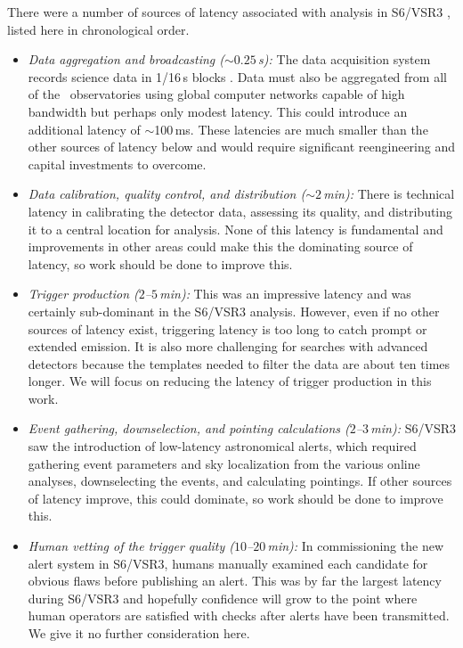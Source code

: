 There were a number of sources of latency associated with \CBC{}
analysis in S6/VSR3 \citep{HugheyGWPAW2011}, listed here in chronological order.
%
\begin{itemize}
%
\item {\it Data aggregation and broadcasting ($\sim$$0.25$\,s):}
The \LIGO{} data acquisition system records science
data in 1/16\,s blocks \citep{Bork2001}. Data must also be aggregated from all
of the \GW\ observatories using global computer networks capable of high
bandwidth but perhaps only modest latency.  This could introduce an additional
latency of $\sim$100\,ms.  These latencies are much smaller than the
other sources of latency below and would require significant reengineering and
capital investments to overcome.
%
\item {\it Data calibration, quality control, and distribution
($\sim$$2$\,min):} There is technical latency in calibrating the detector data,
assessing its quality, and distributing it to a central location for analysis.
None of this latency is fundamental and improvements in other areas could make
this the dominating source of latency, so work should be done to improve this.
%
\item {\it Trigger production ($2$--$5$\,min):} This was an impressive latency
and was certainly sub-dominant in the S6/VSR3 analysis.  However, even if no
other sources of latency exist, triggering latency is too long to catch prompt
or extended
emission. It is also more challenging for searches with advanced detectors
because the templates needed to filter the data are about ten times longer.  We
will focus on reducing the latency of trigger production in this work.
%
\item {\it Event gathering, downselection, and pointing calculations
($2$--$3$\,min):} S6/VSR3 saw the introduction of low-latency astronomical
alerts, which required gathering event parameters and sky localization from the
various online analyses, downselecting the events, and calculating pointings.
If other sources of latency improve, this could dominate, so work should be
done to improve this.
%
\item {\it Human vetting of the trigger quality ($10$--$20$\,min):} In
commissioning the new alert system in S6/VSR3, humans manually examined each
candidate for obvious flaws before publishing an alert. This was by far the
largest latency during S6/VSR3 and hopefully confidence will grow to the
point where human operators are satisfied with checks after alerts have been
transmitted. We give it no further consideration here.
%
\end{itemize}

